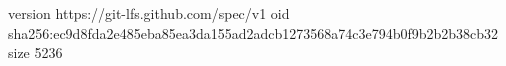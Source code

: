 version https://git-lfs.github.com/spec/v1
oid sha256:ec9d8fda2e485eba85ea3da155ad2adcb1273568a74c3e794b0f9b2b2b38cb32
size 5236
